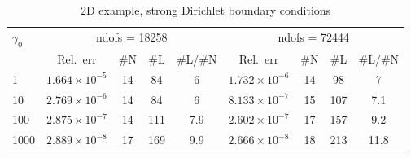 \documentclass[12pt]{article}
\begin{document}
\begin{table}[h]
    \centering
\begin{tabular}{lcccccccc}\toprule
    $\gamma_0$ & \multicolumn{4}{c}{ndofs = 18258} & \multicolumn{4}{c}{ndofs = 72444}
    \\\cmidrule(lr){2-5}\cmidrule(lr){6-9}
            & Rel.~err &\#N& \#L & \#L/\#N& Rel.~err &\#N& \#L & \#L/\#N\\\midrule
    1 &$ 1.664 \times 10^{-5}$& 14 & 84 & $6$ &$1.732\times 10^{-6}$ & 14 & 98& 7\\
    10 & $2.769\times 10^{-6}$ & 14 & 84 & 6 &$8.133\times 10^{-7}$ & 15 & 107 & 7.1\\
    100  &  $2.875\times 10^{-7}$ & 14 & 111 & 7.9 &  $2.602\times 10^{-7}$ & 17 & 157 & 9.2\\
    1000 & $2.889\times 10^{-8}$ & 17 & 169 & 9.9 & $2.666 \times 10^{-8}$ & 18 & 213 & 11.8 \\
    \bottomrule
    \end{tabular}
    \caption{2D example, strong Dirichlet boundary conditions}
\end{table}
\end{document}
